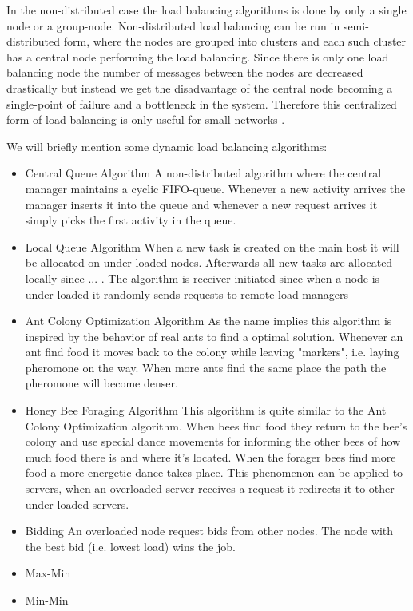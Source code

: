 \documentclass{cslthse-msc}
\begin{document}
In the non-distributed case the load balancing algorithms is done by only a single node or a group-node. Non-distributed load balancing can be run in semi-distributed form, where the nodes are grouped into clusters and each such cluster has a central node performing the load balancing. Since there is only one load balancing node the number of messages between the nodes are decreased drastically but instead we get the disadvantage of the central node becoming a single-point of failure and a bottleneck in the system. Therefore this centralized form of load balancing is only useful for small networks \cite{perfAnalysisLoadCloud}.

We will briefly mention some dynamic load balancing algorithms: %

\begin{itemize}
\item Central Queue Algorithm A non-distributed algorithm where the central manager maintains a cyclic FIFO-queue. Whenever a new activity arrives the manager inserts it into the queue and whenever a new request arrives it simply picks the first activity in the queue. 

\item Local Queue Algorithm When a new task is created on the main host it will be allocated on under-loaded nodes. Afterwards all new tasks are allocated locally since ... \cite{perfAnalysisLoadCloud}. The algorithm is receiver initiated since when a node is under-loaded it randomly sends requests to remote load managers

\item Ant Colony Optimization Algorithm As the name implies this algorithm is inspired by the behavior of real ants to find a optimal solution. Whenever an ant find food it moves back to the colony while leaving "markers", i.e. laying pheromone on the way. When more ants find the same place the path the pheromone will become denser. 

\item Honey Bee Foraging Algorithm This algorithm is quite similar to the Ant Colony Optimization algorithm. When bees find food they return to the bee's colony and use special dance movements for informing the other bees of how much food there is and where it's located. When the forager bees find more food a more energetic dance takes place. This phenomenon can be applied to servers, when an overloaded server receives a request it redirects it to other under loaded servers.


\item Bidding An overloaded node request bids from other nodes. The node with the best bid (i.e. lowest load) wins the job.

\item Max-Min 

\item Min-Min 
\end{itemize}
\end{document}
